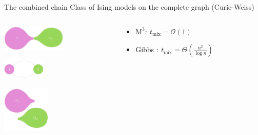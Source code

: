 \documentclass[mathserif]{beamer}
\begin{document}
\begin{frame}{The combined chain}
\vspace{0.5em}
Class of Ising models on the complete graph (Curie-Weiss)

\vspace{1em}
\begin{columns}[t]
\begin{column}{0.3\textwidth}
\centering

\vspace{0.1em}
\includegraphics[width=1.2in]{figures/bottleneck1.pdf}

\vspace{2.5em}
\includegraphics[width=0.8in]{figures/projection.pdf}

\vspace{2em}
\hspace{0.3em}\includegraphics[width=0.9in]{figures/restriction.pdf}
\end{column}

\begin{column}{0.66\textwidth}
\vspace{-1em}

\vspace{1.4em}
\begin{itemize}
\item<4-> $\mathrm{M}^3:\ t_{\mathrm{mix}} = \mathcal{O}(1)$ 
\end{itemize}

\vspace{3.2em}
\begin{itemize}
\item<3-> Gibbs $:\ t_{\mathrm{mix}} = \Theta\left( \displaystyle\frac{n^2}{\log n} \right)$ 
\end{itemize}
\end{column}
\end{columns}

\end{frame}
\end{document}
